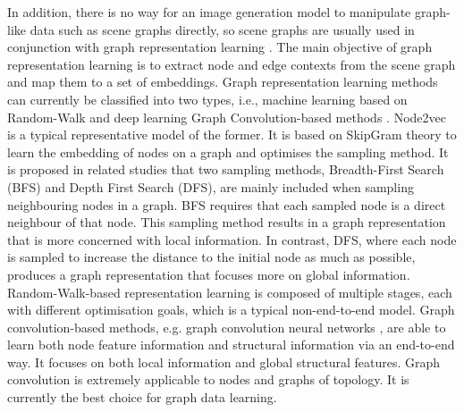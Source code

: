 \documentclass{article}
\begin{document}
In addition, there is no way for an image generation model to manipulate graph-like data such as scene graphs directly, so scene graphs are usually used in conjunction with graph representation learning \cite{Hamilton2020GraphRL}. The main objective of graph representation learning is to extract node and edge contexts from the scene graph and map them to a set of embeddings.  Graph representation learning methods can currently be classified into two types, i.e., machine learning based on Random-Walk and deep learning Graph Convolution-based methods \cite{Hamilton2020GraphRL}. Node2vec \cite{Grover2016node2vecSF} is a typical representative model of the former. It is based on SkipGram \cite{Mikolov2013EfficientEO} theory to learn the embedding of nodes on a graph and optimises the sampling method. It is proposed in related studies \cite{Chen2020GraphRL} that two sampling methods, Breadth-First Search (BFS) and Depth First Search (DFS), are mainly included when sampling neighbouring nodes in a graph. BFS requires that each sampled node is a direct neighbour of that node. This sampling method results in a graph representation that is more concerned with local information. In contrast, DFS, where each node is sampled to increase the distance to the initial node as much as possible, produces a graph representation that focuses more on global information. Random-Walk-based representation learning \cite{Hamilton2017RepresentationLO} is composed of multiple stages, each with different optimisation goals, which is a typical non-end-to-end model. Graph convolution-based methods, e.g. graph convolution neural networks \cite{Johnson2018ImageGF}, are able to learn both node feature information and structural information via an end-to-end way. It focuses on both local information and global structural features. Graph convolution is extremely applicable to nodes and graphs of topology. It is currently the best choice for graph data learning.
\end{document}
